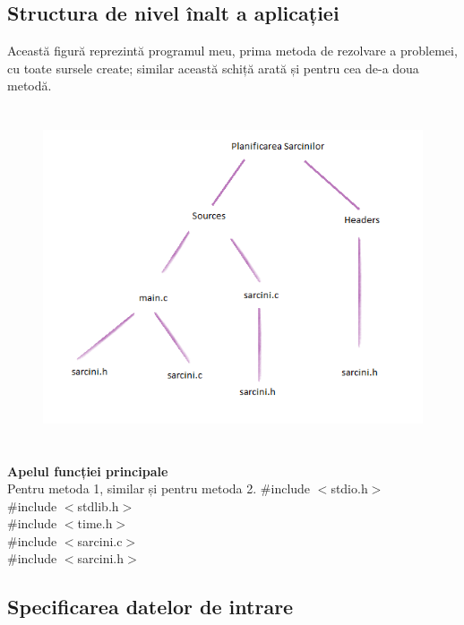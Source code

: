 \documentclass{article}
\begin{document}
\subsection{Structura de nivel înalt a aplicației}
\vspace{1cm}
Această figură reprezintă programul meu, prima metoda de rezolvare a problemei, cu toate sursele create; similar această schiță arată și pentru cea de-a doua metodă. \\
\begin{figure}[htp]
\centering
\includegraphics[width=13cm,height=10cm]{sarcini}
\end{figure}

\textbf{Apelul funcției principale}\\
Pentru metoda 1, similar și pentru metoda 2.
$\#$include $<$stdio.h$>$ \\
$\#$include $<$stdlib.h$>$\\
$\#$include $<$time.h$>$ \\
$\#$include $<$sarcini.c$>$ \\
$\#$include $<$sarcini.h$>$ \\

\newpage





\subsection{Specificarea datelor de intrare}
\end{document}
